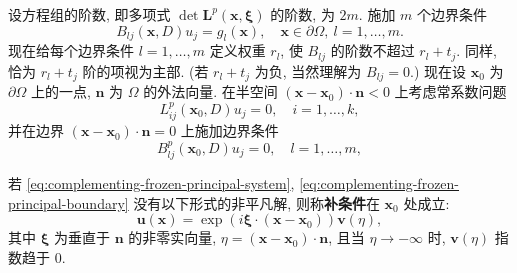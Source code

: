 设方程组的阶数, 即多项式 $\det\bm{L}^p(\bm{x},\bm{\xi})$ 的阶数, 为 $2m$. 施加 $m$ 个边界条件
\begin{equation}\label{eq:weighted-elliptic-general-boundary-conditions}
B_{lj}(\bm{x},D)u_j=g_l(\bm{x}),\quad\bm{x}\in\partial\Omega,\ l=1,\ldots,m.
\end{equation}
现在给每个边界条件 $l=1,\ldots,m$ 定义权重 $r_l$, 使 $B_{lj}$ 的阶数不超过 $r_l+t_j$. 同样, 恰为 $r_l+t_j$ 阶的项视为主部. (若 $r_l+t_j$ 为负, 当然理解为 $B_{lj}=0$.) 现在设 $\bm{x}_0$ 为 $\partial\Omega$ 上的一点, $\bm{n}$ 为 $\Omega$ 的外法向量. 在半空间 $(\bm{x}-\bm{x}_0)\cdot\bm{n}<0$ 上考虑常系数问题
\begin{equation}\label{eq:complementing-frozen-principal-system}
L_{ij}^p(\bm{x}_0,D)u_j=0,\quad i=1,\ldots,k,
\end{equation}
并在边界 $(\bm{x}-\bm{x}_0)\cdot\bm{n}=0$ 上施加边界条件
\begin{equation}\label{eq:complementing-frozen-principal-boundary}
B_{lj}^p(\bm{x}_0,D)u_j=0,\quad l=1,\ldots,m,
\end{equation}


\begin{Definition}
\label{def:elliptic-system-complementing-condition}
若 \eqref{eq:complementing-frozen-principal-system}, \eqref{eq:complementing-frozen-principal-boundary} 没有以下形式的非平凡解, 则称\textbf{补条件}在 $\bm{x}_0$ 处成立:
\begin{equation}\label{eq:complementing-decaying-tangential-mode}
\bm{u}(\bm{x})=\exp(i\bm{\xi}\cdot(\bm{x}-\bm{x}_0))\bm{v}(\eta),
\end{equation}
其中 $\bm{\xi}$ 为垂直于 $\bm{n}$ 的非零实向量, $\eta=(\bm{x}-\bm{x}_0)\cdot\bm{n}$, 且当 $\eta\to-\infty$ 时, $\bm{v}(\eta)$ 指数趋于 $0$.
\end{Definition}
